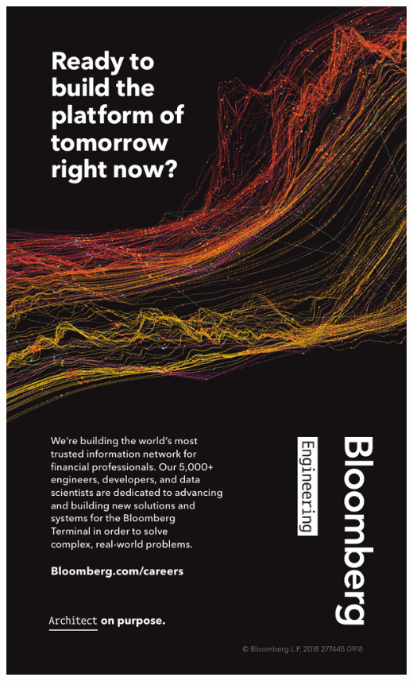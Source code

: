 \thispagestyle{empty}
\begin{center}
  \vfill
  \includegraphics[width=\textwidth]{content/ads/full/bloomberg.pdf}
  \vfill
\end{center}
\clearpage

